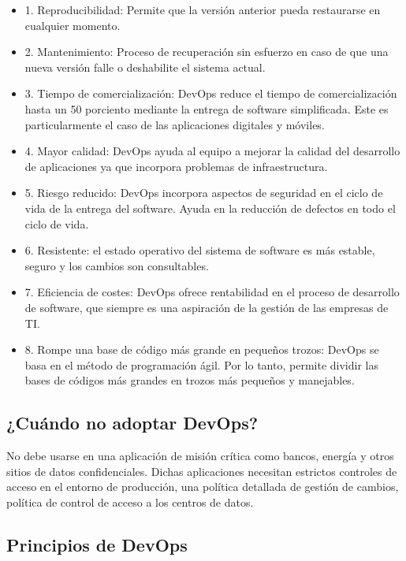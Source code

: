 \documentclass[preprint,12pt]{elsarticle}
\begin{document}
\begin{itemize}

\item 1. Reproducibilidad: Permite que la versión anterior pueda restaurarse en cualquier momento.
\item 2. Mantenimiento: Proceso de recuperación sin esfuerzo en caso de que una nueva versión falle o deshabilite el sistema actual.
\item 3. Tiempo de comercialización: DevOps reduce el tiempo de comercialización hasta un 50 porciento mediante la entrega de software simplificada. Este es particularmente el caso de las aplicaciones digitales y móviles.
\item 4. Mayor calidad: DevOps ayuda al equipo a mejorar la calidad del desarrollo de aplicaciones ya que incorpora problemas de infraestructura.
\item 5. Riesgo reducido: DevOps incorpora aspectos de seguridad en el ciclo de vida de la entrega del software. Ayuda en la reducción de defectos en todo el ciclo de vida.
\item 6. Resistente: el estado operativo del sistema de software es más estable, seguro y los cambios son consultables.
\item 7. Eficiencia de costes: DevOps ofrece rentabilidad en el proceso de desarrollo de software, que siempre es una aspiración de la gestión de las empresas de TI.
\item 8. Rompe una base de código más grande en pequeños trozos: DevOps se basa en el método de programación ágil. Por lo tanto, permite dividir las bases de códigos más grandes en trozos más pequeños y manejables. 

\end{itemize}

\subsection{¿Cuándo no adoptar DevOps?}

No debe usarse en una aplicación de misión crítica como bancos, energía y otros sitios de datos confidenciales.
Dichas aplicaciones necesitan estrictos controles de acceso en el entorno de producción, una política detallada de gestión de cambios, política de control de acceso a los centros de datos.


\subsection{Principios de DevOps}
\end{document}
